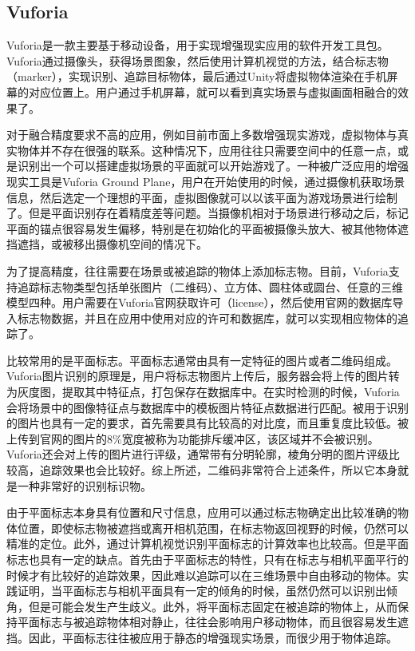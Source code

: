 \subsection{Vuforia}
Vuforia\cite{Vuforia}是一款主要基于移动设备，用于实现增强现实应用的软件开发工具包。Vuforia通过摄像头，获得场景图象，然后使用计算机视觉的方法，结合标志物（marker），实现识别、追踪目标物体，最后通过Unity将虚拟物体渲染在手机屏幕的对应位置上。用户通过手机屏幕，就可以看到真实场景与虚拟画面相融合的效果了。
	
对于融合精度要求不高的应用，例如目前市面上多数增强现实游戏，虚拟物体与真实物体并不存在很强的联系。这种情况下，应用往往只需要空间中的任意一点，或是识别出一个可以搭建虚拟场景的平面就可以开始游戏了。一种被广泛应用的增强现实工具是Vuforia Ground Plane\cite{VuforiaGround}，用户在开始使用的时候，通过摄像机获取场景信息，然后选定一个理想的平面，虚拟图像就可以以该平面为游戏场景进行绘制了。但是平面识别存在着精度差等问题。当摄像机相对于场景进行移动之后，标记平面的锚点很容易发生偏移，特别是在初始化的平面被摄像头放大、被其他物体遮挡遮挡，或被移出摄像机空间的情况下。

为了提高精度，往往需要在场景或被追踪的物体上添加标志物。目前，Vuforia支持追踪标志物类型包括单张图片（二维码）、立方体、圆柱体或圆台、任意的三维模型四种。用户需要在Vuforia官网获取许可（license），然后使用官网的数据库导入标志物数据，并且在应用中使用对应的许可和数据库，就可以实现相应物体的追踪了。
	
比较常用的是平面标志。平面标志通常由具有一定特征的图片或者二维码组成。Vuforia图片识别的原理是，用户将标志物图片上传后，服务器会将上传的图片转为灰度图，提取其中特征点，打包保存在数据库中。在实时检测的时候，Vuforia会将场景中的图像特征点与数据库中的模板图片特征点数据进行匹配。被用于识别的图片也具有一定的要求，首先需要具有比较高的对比度，而且重复度比较低。被上传到官网的图片的8\%宽度被称为功能排斥缓冲区，该区域并不会被识别。Vuforia还会对上传的图片进行评级，通常带有分明轮廓，棱角分明的图片评级比较高，追踪效果也会比较好。综上所述，二维码非常符合上述条件，所以它本身就是一种非常好的识别标识物。

由于平面标志本身具有位置和尺寸信息，应用可以通过标志物确定出比较准确的物体位置，即使标志物被遮挡或离开相机范围，在标志物返回视野的时候，仍然可以精准的定位。此外，通过计算机视觉识别平面标志的计算效率也比较高。但是平面标志也具有一定的缺点。首先由于平面标志的特性，只有在标志与相机平面平行的时候才有比较好的追踪效果，因此难以追踪可以在三维场景中自由移动的物体。实践证明，当平面标志与相机平面具有一定的倾角的时候，虽然仍然可以识别出倾角，但是可能会发生产生歧义。此外，将平面标志固定在被追踪的物体上，从而保持平面标志与被追踪物体相对静止，往往会影响用户移动物体，而且很容易发生遮挡。因此，平面标志往往被应用于静态的增强现实场景，而很少用于物体追踪。


